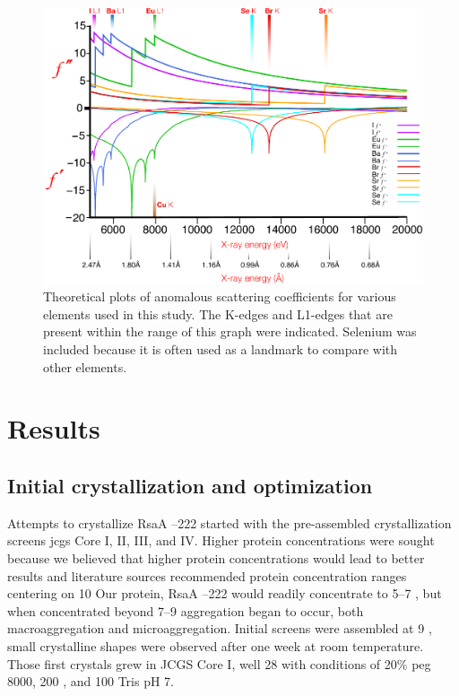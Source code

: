 \begin{figure}[htb]
  	\begin{center}
   		\includegraphics[width=\textwidth]{crystal_chapter/img/edgeplots.pdf}
   	\end{center}
   	\caption[Edge plots for useful anomalous dispersion elements]{
   	Theoretical plots of anomalous scattering coefficients for various elements used in this study. The K-edges and L1-edges that are present within the range of this graph were indicated. Selenium was included because it is often used as a landmark to compare with other elements.}
   	\label{fig:edges}
\end{figure}    

\section{Results}\label{sec:crystal-results}

\subsection{Initial crystallization and optimization}\label{sec:init-cryst-optim} 
 Attempts to crystallize RsaA --222 started with the pre-assembled crystallization screens \ac{jcgs} Core I, II, III, and IV. Higher protein concentrations were sought because we believed that higher protein concentrations would lead to better results and literature sources recommended protein concentration ranges centering on 10 \mgperml{} Our protein, RsaA --222 would readily concentrate to 5--7 \mgperml, but when concentrated beyond 7--9 \mgperml aggregation began to occur, both macroaggregation and microaggregation. Initial screens were assembled at 9 \mgperml, small crystalline shapes were observed after one week at room temperature. Those first crystals grew in JCGS Core I, well 28 with conditions of 20\% \ac{peg} 8000, 200 \millimolar {}, and 100 \millimolar Tris pH 7.
 
